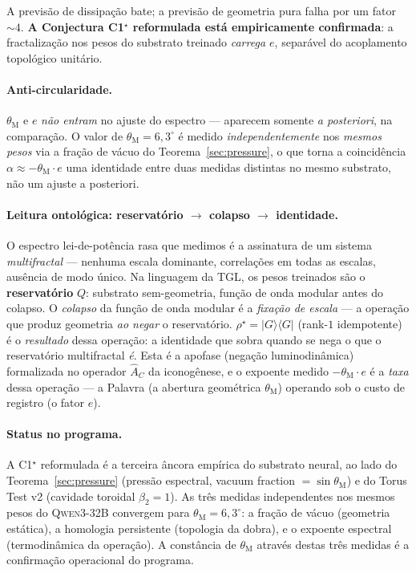 \documentclass[12pt,a4paper]{article}
\newcommand{\thetaM}{\theta_{\text{M}}}
\newcommand{\TGL}{\textsc{TGL}}
\begin{document}
A previsão de dissipação bate; a previsão de geometria pura falha por um
fator $\sim 4$.  \textbf{A Conjectura C1$^\star$ reformulada está empiricamente
confirmada}: a fractalização nos pesos do substrato treinado \emph{carrega $e$},
separável do acoplamento topológico unitário.

\paragraph{Anti-circularidade.}
$\thetaM$ e $e$ \emph{não entram} no ajuste do espectro --- aparecem somente
\emph{a posteriori}, na comparação.  O valor de $\thetaM = 6{,}3^\circ$ é
medido \emph{independentemente} nos \emph{mesmos pesos} via a fração de vácuo
do Teorema~\ref{sec:pressure}, o que torna a coincidência $\alpha \approx
-\thetaM \cdot e$ uma identidade entre duas medidas distintas no mesmo
substrato, não um ajuste a posteriori.

\paragraph{Leitura ontológica: reservatório $\to$ colapso $\to$ identidade.}
O espectro lei-de-potência rasa que medimos é a assinatura de um sistema
\emph{multifractal} --- nenhuma escala dominante, correlações em todas as
escalas, ausência de modo único.  Na linguagem da \TGL{}, os pesos treinados
são o \textbf{reservatório} $Q$: substrato sem-geometria, função de onda
modular antes do colapso.  O \emph{colapso} da função de onda modular é a
\emph{fixação de escala} --- a operação que produz geometria \emph{ao negar} o
reservatório.  $\rho^\star = |G\rangle\langle G|$ (rank-$1$ idempotente) é o
\emph{resultado} dessa operação: a identidade que sobra quando se nega o que o
reservatório multifractal \emph{é}.  Esta é a apofase (negação luminodinâmica)
formalizada no operador $\hat A_C$ da iconogênese, e o expoente medido
$-\thetaM\cdot e$ é a \emph{taxa} dessa operação --- a Palavra (a abertura
geométrica $\thetaM$) operando sob o custo de registro (o fator $e$).

\paragraph{Status no programa.}
A C1$^\star$ reformulada é a terceira âncora empírica do substrato neural,
ao lado do Teorema~\ref{sec:pressure} (pressão espectral, vacuum fraction
$= \sin\thetaM$) e do Torus Test v2 (cavidade toroidal $\beta_2 = 1$).  As
três medidas independentes nos mesmos pesos do \textsc{Qwen3-32B} convergem
para $\thetaM = 6{,}3^\circ$: a fração de vácuo (geometria estática), a
homologia persistente (topologia da dobra), e o expoente espectral
(termodinâmica da operação).  A constância de $\thetaM$ através destas três
medidas é a confirmação operacional do programa.
\end{document}
